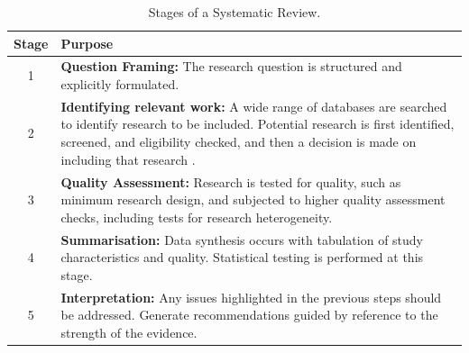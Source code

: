 \documentclass[10pt,oneside]{book}
\begin{document}



\begin{table}[t]
\centering
\small
\begin{tabular}{|c|p{}|}
\hline
\textbf{Stage} & \textbf{Purpose} \\
\hline
1 & \textbf{Question Framing:} The research question is structured and explicitly formulated. \\\hline
2 & \textbf{Identifying relevant work:} A wide range of databases are searched to identify research to be included. Potential research is first identified, screened, and eligibility checked, and then a decision is made on including that research \cite{tawfik_step_2019}. \\\hline
3 & \textbf{Quality Assessment:} Research is tested for quality, such as minimum research design, and subjected to higher quality assessment checks, including tests for research heterogeneity. \\\hline
4 & \textbf{Summarisation:} Data synthesis occurs with tabulation of study characteristics and quality. Statistical testing is performed at this stage. \\\hline
5 & \textbf{Interpretation:} Any issues highlighted in the previous steps should be addressed. Generate recommendations guided by reference to the strength of the evidence. \\
\hline
\end{tabular}
\caption{Stages of a Systematic Review.}
\label{tab:stages_of_systematic review}
\end{table}
\end{document}

